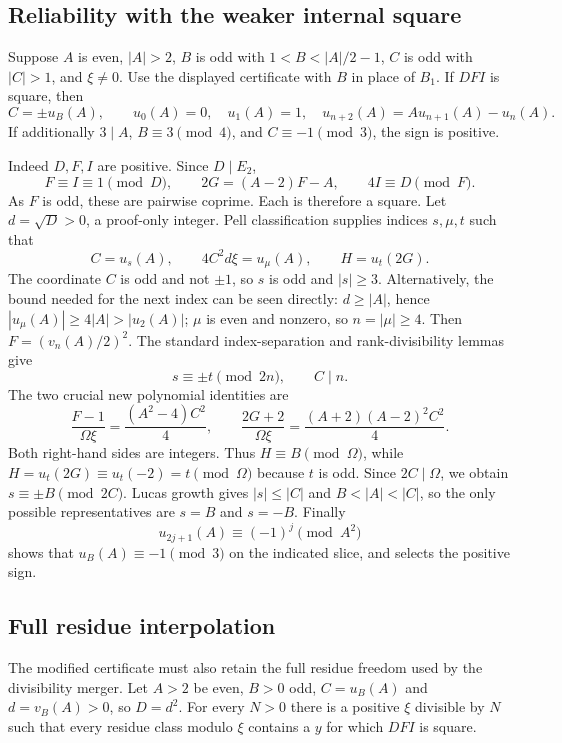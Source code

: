 \subsection{Reliability with the weaker internal square}

Suppose $A$ is even, $|A|>2$, $B$ is odd with
$1<B<|A|/2-1$, $C$ is odd with $|C|>1$, and $\xi\ne0$.
Use the displayed certificate with $B$ in place of $B_1$.
If $DFI$ is square, then
\[
 C=\pm u_B(A),\qquad u_0(A)=0,\quad u_1(A)=1,\quad
 u_{n+2}(A)=Au_{n+1}(A)-u_n(A).
\]
If additionally $3\mid A$, $B\equiv3\pmod4$, and
$C\equiv-1\pmod3$, the sign is positive.

Indeed $D,F,I$ are positive. Since $D\mid E_2$,
\[
 F\equiv I\equiv1\pmod D,
 \qquad 2G=(A-2)F-A,
 \qquad4I\equiv D\pmod F.
\]
As $F$ is odd, these are pairwise coprime. Each is therefore a square.
Let $d=\sqrt D>0$, a proof-only integer. Pell classification supplies
indices $s,\mu,t$ such that
\[
 C=u_s(A),\qquad4C^2d\xi=u_\mu(A),\qquad H=u_t(2G).
\]
The coordinate $C$ is odd and not $\pm1$, so $s$ is odd and $|s|\ge3$.
Alternatively, the bound needed for the next index can be seen directly:
$d\ge|A|$, hence $|u_\mu(A)|\ge4|A|>|u_2(A)|$;
$\mu$ is even and nonzero, so $n=|\mu|\ge4$.
Then $F=(v_n(A)/2)^2$. The standard index-separation and rank-divisibility
lemmas give
\[
 s\equiv\pm t\pmod{2n},\qquad C\mid n.
\]
The two crucial new polynomial identities are
\[
 \frac{F-1}{\Omega\xi}=\frac{(A^2-4)C^2}{4},\qquad
 \frac{2G+2}{\Omega\xi}
       =\frac{(A+2)(A-2)^2C^2}{4}.
\]
Both right-hand sides are integers. Thus $H\equiv B\pmod\Omega$,
while $H=u_t(2G)\equiv u_t(-2)=t\pmod\Omega$ because $t$ is odd.
Since $2C\mid\Omega$, we obtain $s\equiv\pm B\pmod{2C}$.
Lucas growth gives $|s|\le|C|$ and $B<|A|<|C|$, so the only
possible representatives are $s=B$ and $s=-B$.
Finally
\[
 u_{2j+1}(A)\equiv(-1)^j\pmod{A^2}
\]
shows that $u_B(A)\equiv-1\pmod3$ on the indicated slice, and selects
the positive sign.

\subsection{Full residue interpolation}

The modified certificate must also retain the full residue freedom used
by the divisibility merger. Let $A>2$ be even, $B>0$ odd,
$C=u_B(A)$ and $d=v_B(A)>0$, so $D=d^2$.
For every $N>0$ there is a positive $\xi$ divisible by $N$ such that
every residue class modulo $\xi$ contains a $y$ for which $DFI$ is square.

